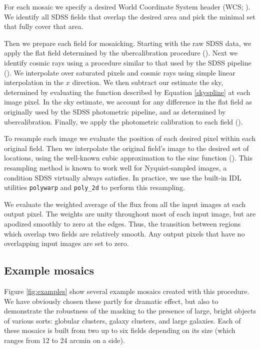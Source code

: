 \documentclass[10pt,preprint]{aastex}
\begin{document}
For each mosaic we specify a desired World Coordinate System header
(WCS; \citealt{greisen02a}). We identify all SDSS fields that overlap
the desired area and pick the minimal set that fully cover that area.

Then we prepare each field for mosaicking.  Starting with the raw SDSS
data, we apply the flat field determined by the ubercalibration
procedure (\citealt{padmanabhan07b}). Next we identify cosmic rays
using a procedure similar to that used by the SDSS pipeline
(\citealt{lupton01a}). We interpolate over saturated pixels and cosmic
rays using simple linear interpolation in the $x$ direction.  We then
subtract our estimate the sky, determined by evaluating the function
described by Equation \ref{skyspline} at each image pixel. In the sky
estimate, we account for any difference in the flat field as
originally used by the SDSS photometric pipeline, and as determined by
ubercalibration. Finally, we apply the photometric calibration to each
field (\citealt{padmanabhan07b}).

To resample each image we evaluate the position of each desired pixel
within each original field. Then we interpolate the original field's
image to the desired set of locations, using the well-known cubic
approximation to the sinc function (\citealt{park83a}). This
resampling method is known to work well for Nyquist-sampled images, a
condition SDSS virtually always satisfies. In practice, we use the
built-in IDL utilities {\tt polywarp} and {\tt poly\_2d} to perform
this resampling.

We evaluate the weighted average of the flux from all the input images
at each output pixel. The weights are unity throughout most of each
input image, but are apodized smoothly to zero at the edges. Thus, the
transition between regions which overlap two fields are relatively
smooth. Any output pixels that have no overlapping input images are
set to zero.

\subsection{Example mosaics}

Figure \ref{fig:examples} show several example mosaics created with
this procedure.  We have obviously chosen these partly for dramatic
effect, but also to demonstrate the robustness of the masking to the
presence of large, bright objects of various sorts: globular clusters,
galaxy clusters, and large galaxies. Each of these mosaics is built
from two up to six fields depending on its size (which ranges from 12
to 24 arcmin on a side).
\end{document}
